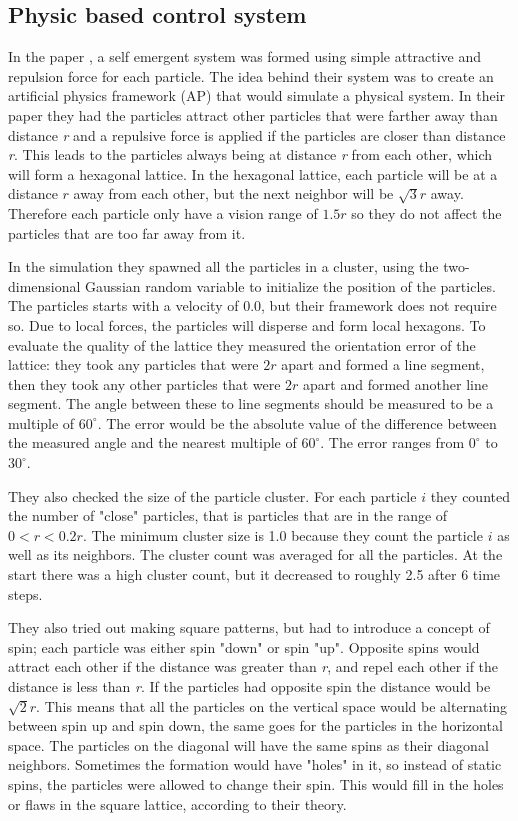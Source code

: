 \subsection{Physic based control system}
In the paper \citep{Spears2004}, a self emergent system was formed using simple attractive and repulsion force for each particle. The idea behind their system was to create an artificial physics framework (AP) that would simulate a physical system. In their paper they had the particles attract other particles that were farther away than distance \textit{r} and a repulsive force is applied if the particles are closer than distance \textit{r}. This leads to the particles always being at distance \textit{r} from each other, which will form a hexagonal lattice. In the hexagonal lattice, each particle will be at a distance $r$ away from each other, but the next neighbor will be $\sqrt{3}r$ away. Therefore each particle only have a vision range of $1.5r$ so they do not affect the particles that are too far away from it. 

In the simulation they spawned all the particles in a cluster, using the two-dimensional Gaussian random variable to initialize the position of the particles. The particles starts with a velocity of 0.0, but their framework does not require so. Due to local forces, the particles will disperse and form local hexagons. To evaluate the quality of the lattice they measured the orientation error of the lattice: they took any particles that were $2r$ apart and formed a line segment, then they took any other particles that were $2r$ apart and formed another line segment. The angle between these to line segments should be measured to be a multiple of $60^{\circ}$. The error would be the absolute value of the difference between the measured angle and the nearest multiple of $60^{\circ}$. The error ranges from $0^{\circ}$ to $30^{\circ}$.

They also checked the size of the particle cluster. For each particle $i$ they counted the number of "close" particles, that is particles that are in the range of $0<r<0.2r$. The minimum cluster size is 1.0 because they count the particle $i$ as well as its neighbors. The cluster count was averaged for all the particles. At the start there was a high cluster count, but it decreased to roughly 2.5 after 6 time steps. 

They also tried out making square patterns, but had to introduce a concept of spin; each particle was either spin "down" or spin "up". Opposite spins would attract each other if the distance was greater than \textit{r}, and repel each other if the distance is less than \textit{r}. If the particles had opposite spin the distance would be $\sqrt{2}r$. This means that all the particles on the vertical space would be alternating between spin up and spin down, the same goes for the particles in the horizontal space. The particles on the diagonal will have the same spins as their diagonal neighbors. Sometimes the formation would have "holes" in it, so instead of static spins, the particles were allowed to change their spin. This would fill in the holes or flaws in the square lattice, according to their theory.

